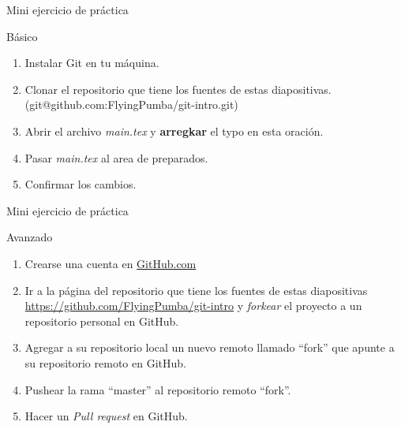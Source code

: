\documentclass{beamer}
\begin{document}
\begin{frame}{Mini ejercicio de práctica}

	\begin{block}{Básico}
		\begin{enumerate}
			\item Instalar Git en tu máquina.
			\item Clonar el repositorio que tiene los fuentes de estas diapositivas. (git@github.com:FlyingPumba/git-intro.git)
			\item Abrir el archivo \textit{main.tex} y \textbf{arregkar} el typo en esta oración.
			\item Pasar \textit{main.tex} al area de preparados.
			\item Confirmar los cambios.
		\end{enumerate}
	\end{block}

\end{frame}


\begin{frame}{Mini ejercicio de práctica}

	\begin{block}{Avanzado}
		\begin{enumerate}
			\item Crearse una cuenta en \url{GitHub.com}
			\item Ir a la página del repositorio que tiene los fuentes de estas diapositivas \url{https://github.com/FlyingPumba/git-intro} y \textit{forkear} el proyecto a un repositorio personal en GitHub.
			\item Agregar a su repositorio local un nuevo remoto llamado ``fork'' que apunte a su repositorio remoto en GitHub.
			\item Pushear la rama ``master'' al repositorio remoto ``fork''.
			\item Hacer un \textit{Pull request} en GitHub.
		\end{enumerate}
	\end{block}

\end{frame}
\end{document}
